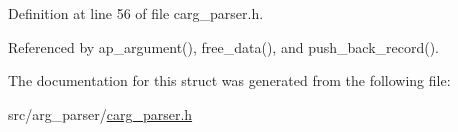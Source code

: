 Definition at line 56 of file carg\_\-parser.h.



Referenced by ap\_\-argument(), free\_\-data(), and push\_\-back\_\-record().



The documentation for this struct was generated from the following file:\begin{DoxyCompactItemize}
\item 
src/arg\_\-parser/\hyperlink{carg__parser_8h}{carg\_\-parser.h}\end{DoxyCompactItemize}

